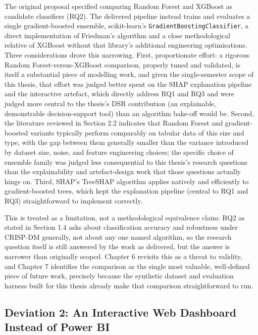 \documentclass[12pt,oneside]{report}
\begin{document}
The original proposal specified comparing Random Forest and XGBoost as
candidate classifiers (RQ2). The delivered pipeline instead trains and
evaluates a single gradient-boosted ensemble, scikit-learn's
\texttt{GradientBoostingClassifier}, a direct implementation of
Friedman's \citeyearpar{friedman2001greedy} algorithm and a close
methodological relative of XGBoost \citep{chen2016xgboost} without that
library's additional engineering optimisations. Three considerations
drove this narrowing. First, proportionate effort: a rigorous Random
Forest-versus-XGBoost comparison, properly tuned and validated, is
itself a substantial piece of modelling work, and given the
single-semester scope of this thesis, that effort was judged better
spent on the SHAP explanation pipeline and the interactive artefact,
which directly address RQ1 and RQ3 and were judged more central to the
thesis's DSR contribution (an explainable, demonstrable decision-support
tool) than an algorithm bake-off would be. Second, the literature
reviewed in Section 2.2 indicates that Random Forest and
gradient-boosted variants typically perform comparably on tabular data
of this size and type, with the gap between them generally smaller than
the variance introduced by dataset size, noise, and feature engineering
choices; the specific choice of ensemble family was judged less
consequential to this thesis's research questions than the
explainability and artefact-design work that those questions actually
hinge on. Third, SHAP's TreeSHAP algorithm \citep{lundberg2017unified}
applies natively and efficiently to gradient-boosted trees, which kept
the explanation pipeline (central to RQ1 and RQ3) straightforward to
implement correctly.

This is treated as a limitation, not a methodological equivalence claim:
RQ2 as stated in Section 1.4 asks about classification accuracy and
robustness under CRISP-DM generally, not about any one named algorithm,
so the research question itself is still answered by the work as
delivered, but the answer is narrower than originally scoped. Chapter 6
revisits this as a threat to validity, and Chapter 7 identifies the
comparison as the single most valuable, well-defined piece of future
work, precisely because the synthetic dataset and evaluation harness
built for this thesis already make that comparison straightforward to
run.

\hypertarget{deviation-2-an-interactive-web-dashboard-instead-of-power-bi}{%
\subsection{Deviation 2: An Interactive Web Dashboard Instead of Power
BI}\label{deviation-2-an-interactive-web-dashboard-instead-of-power-bi}}
\end{document}
